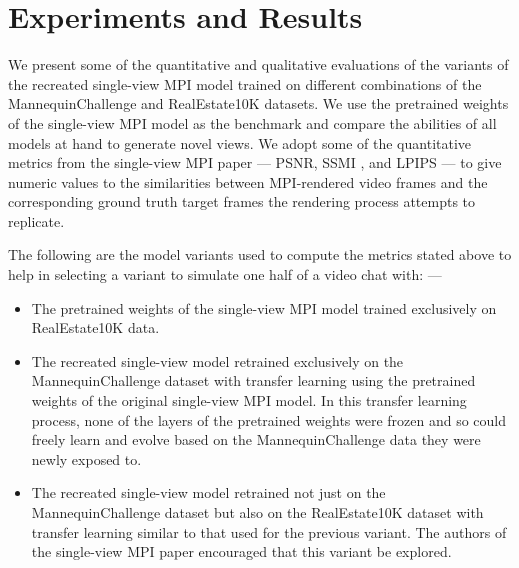 \chapter{Experiments and Results}\label{ch4:experiments-results}

We present some of the quantitative and qualitative evaluations of the variants of the recreated single-view MPI model trained on different combinations of the MannequinChallenge and RealEstate10K datasets. We use the pretrained weights of the single-view MPI model as the benchmark and compare the abilities of all models at hand to generate novel views. We adopt some of the quantitative metrics from the single-view MPI paper \cite{single_view_mpi} --- PSNR, SSMI \cite{wang_image_2004}, and LPIPS \cite{zhang_unreasonable_2018} --- to give numeric values to the similarities between MPI-rendered video frames and the corresponding ground truth target frames the rendering process attempts to replicate.

The following are the model variants used to compute the metrics stated above to help in selecting a variant to simulate one half of a video chat with: ---
\begin{itemize}
    \item The pretrained weights of the single-view MPI model trained exclusively on RealEstate10K data.
    \item The recreated single-view model retrained exclusively on the MannequinChallenge dataset with transfer learning using the pretrained weights of the original single-view MPI model. In this transfer learning process, none of the layers of the pretrained weights were frozen and so could freely learn and evolve based on the MannequinChallenge data they were newly exposed to.
    \item The recreated single-view model retrained not just on the MannequinChallenge dataset but also on the RealEstate10K dataset with transfer learning similar to that used for the previous variant. The authors of the single-view MPI \cite{single_view_mpi} paper encouraged that this variant be explored. 
\end{itemize}

